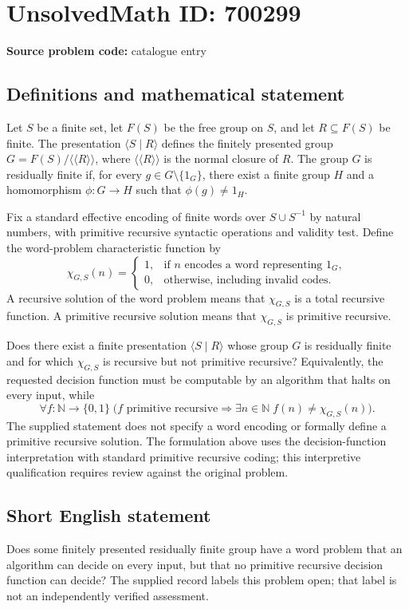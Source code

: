 \documentclass[11pt]{article}
\newcommand{\N}{\mathbb{N}}
\begin{document}
\section*{UnsolvedMath ID: 700299}
\textbf{Source problem code:} catalogue entry
\subsection{Definitions and mathematical statement}
Let \(S\) be a finite set, let \(F(S)\) be the free group on \(S\), and let \(R\subseteq F(S)\) be finite. The presentation \(\langle S\mid R\rangle\) defines the finitely presented group \(G=F(S)/\langle\!\langle R\rangle\!\rangle\), where \(\langle\!\langle R\rangle\!\rangle\) is the normal closure of \(R\). The group \(G\) is residually finite if, for every \(g\in G\setminus\{1_G\}\), there exist a finite group \(H\) and a homomorphism \(\phi:G\to H\) such that \(\phi(g)\ne 1_H\).

Fix a standard effective encoding of finite words over \(S\cup S^{-1}\) by natural numbers, with primitive recursive syntactic operations and validity test. Define the word-problem characteristic function by
\[
\chi_{G,S}(n)=
\begin{cases}
1,&\text{if }n\text{ encodes a word representing }1_G,\\
0,&\text{otherwise, including invalid codes.}
\end{cases}
\]
A recursive solution of the word problem means that \(\chi_{G,S}\) is a total recursive function. A primitive recursive solution means that \(\chi_{G,S}\) is primitive recursive.

Does there exist a finite presentation \(\langle S\mid R\rangle\) whose group \(G\) is residually finite and for which \(\chi_{G,S}\) is recursive but not primitive recursive? Equivalently, the requested decision function must be computable by an algorithm that halts on every input, while
\[
\forall f:\N\to\{0,1\}\;\bigl(f\text{ primitive recursive}\Longrightarrow \exists n\in\N\; f(n)\ne\chi_{G,S}(n)\bigr).
\]
The supplied statement does not specify a word encoding or formally define a primitive recursive solution. The formulation above uses the decision-function interpretation with standard primitive recursive coding; this interpretive qualification requires review against the original problem.
\subsection{Short English statement}
Does some finitely presented residually finite group have a word problem that an algorithm can decide on every input, but that no primitive recursive decision function can decide? The supplied record labels this problem open; that label is not an independently verified assessment.
\end{document}
